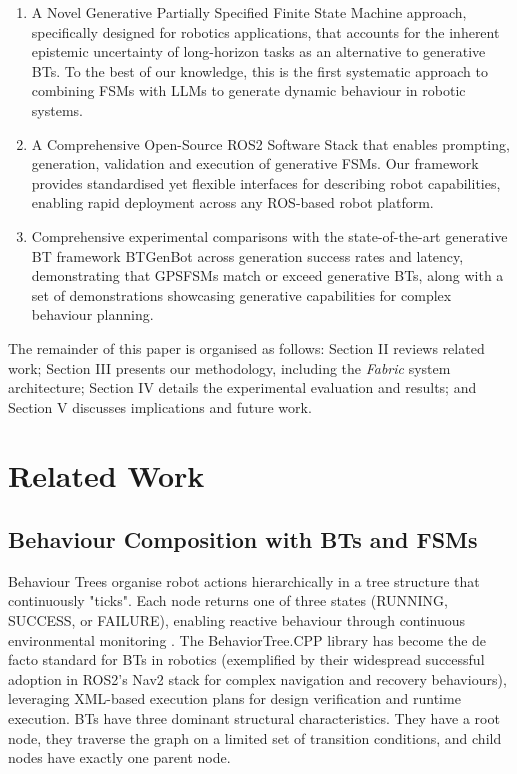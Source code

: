 \documentclass[letterpaper, 10pt, conference]{ieeeconf}      %
\begin{document}
\begin{enumerate}
    \item A Novel Generative Partially Specified Finite State Machine approach, specifically designed for robotics applications, that accounts for the inherent epistemic uncertainty of long-horizon tasks as an alternative to generative BTs. To the best of our knowledge, this is the first systematic approach to combining FSMs with LLMs to generate dynamic behaviour in robotic systems.
    
    \item A Comprehensive Open-Source ROS2 Software Stack that enables prompting, generation, validation and execution of generative FSMs. Our framework provides standardised yet flexible interfaces for describing robot capabilities, enabling rapid deployment across any ROS-based robot platform.
    
    \item Comprehensive experimental comparisons with the state-of-the-art generative BT framework BTGenBot \cite{izzo_btgenbot_2024} across generation success rates and latency, demonstrating that GPSFSMs match or exceed generative BTs, along with a set of demonstrations showcasing generative capabilities for complex behaviour planning.
\end{enumerate}

The remainder of this paper is organised as follows: Section II reviews related work; Section III presents our methodology, including the \textit{Fabric} system architecture; Section IV details the experimental evaluation and results; and Section V discusses implications and future work.


\section{Related Work}

\subsection{Behaviour Composition with BTs and FSMs}

Behaviour Trees organise robot actions hierarchically in a tree structure that continuously "ticks". Each node returns one of three states (RUNNING, SUCCESS, or FAILURE), enabling reactive behaviour through continuous environmental monitoring \cite{iovino_comparison_2024}. The BehaviorTree.CPP library has become the de facto standard for BTs in robotics (exemplified by their widespread successful adoption in ROS2's Nav2 stack for complex navigation and recovery behaviours), leveraging XML-based execution plans for design verification and runtime execution. BTs have three dominant structural characteristics. They have a root node, they traverse the graph on a limited set of transition conditions, and child nodes have exactly one parent node.
\end{document}
